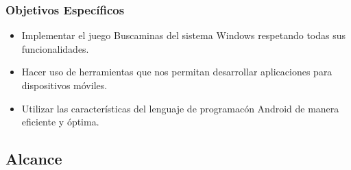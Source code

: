 \documentclass[11pt]{article} %
\begin{document}
\subsubsection{\textbf{Objetivos Espec\'ificos}}
\begin{itemize}
\item Implementar el juego Buscaminas del sistema Windows respetando todas sus funcionalidades.
\item Hacer uso de herramientas que nos permitan desarrollar aplicaciones para dispositivos m\'oviles.
\item Utilizar las caracter\'isticas del lenguaje de programac\'on Android de manera eficiente y \'optima.
\end{itemize}
\subsection{\textbf{Alcance}}
\end{document}
